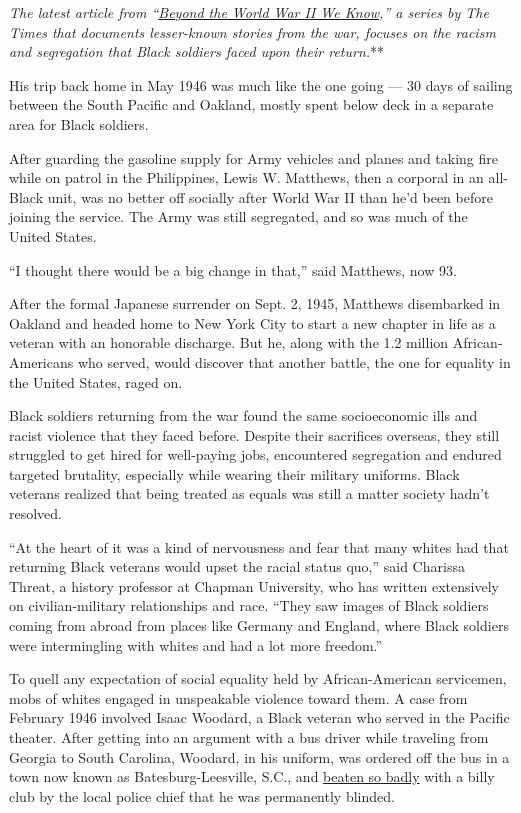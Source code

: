 \emph{\emph{\emph{The latest article from
``}\href{https://www.nytimes3xbfgragh.onion/spotlight/beyond-wwii}{\emph{Beyond
the World War II We Know}}},'' a series by The Times that documents
lesser-known stories from the war, focuses on the racism and segregation
that Black soldiers faced upon their return.}**

His trip back home in May 1946 was much like the one going --- 30 days
of sailing between the South Pacific and Oakland, mostly spent below
deck in a separate area for Black soldiers.

After guarding the gasoline supply for Army vehicles and planes and
taking fire while on patrol in the Philippines, Lewis W. Matthews, then
a corporal in an all-Black unit, was no better off socially after World
War II than he'd been before joining the service. The Army was still
segregated, and so was much of the United States.

``I thought there would be a big change in that,'' said Matthews, now
93.

After the formal Japanese surrender on Sept. 2, 1945, Matthews
disembarked in Oakland and headed home to New York City to start a new
chapter in life as a veteran with an honorable discharge. But he, along
with the 1.2 million African-Americans who served, would discover that
another battle, the one for equality in the United States, raged on.

Black soldiers returning from the war found the same socioeconomic ills
and racist violence that they faced before. Despite their sacrifices
overseas, they still struggled to get hired for well-paying jobs,
encountered segregation and endured targeted brutality, especially while
wearing their military uniforms. Black veterans realized that being
treated as equals was still a matter society hadn't resolved.

``At the heart of it was a kind of nervousness and fear that many whites
had that returning Black veterans would upset the racial status quo,''
said Charissa Threat, a history professor at Chapman University, who has
written extensively on civilian-military relationships and race. ``They
saw images of Black soldiers coming from abroad from places like Germany
and England, where Black soldiers were intermingling with whites and had
a lot more freedom.''

To quell any expectation of social equality held by African-American
servicemen, mobs of whites engaged in unspeakable violence toward them.
A case from February 1946 involved Isaac Woodard, a Black veteran who
served in the Pacific theater. After getting into an argument with a bus
driver while traveling from Georgia to South Carolina, Woodard, in his
uniform, was ordered off the bus in a town now known as
Batesburg-Leesville, S.C., and
\href{https://www.nytimes3xbfgragh.onion/2019/02/08/us/sergeant-woodard-batesburg-south-carolina.html}{beaten
so badly} with a billy club by the local police chief that he was
permanently blinded.

